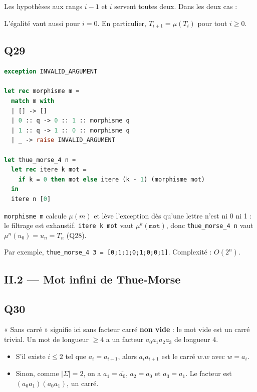 \documentclass[11pt,a4paper]{article}
\providecommand{\tightlist}{\setlength{\itemsep}{0pt}\setlength{\parskip}{0pt}}
\newcommand{\equationajustee}[1]{%
  \sbox{\boiteequation}{$\displaystyle #1$}%
  \ifdim\wd\boiteequation>\linewidth
    \[\resizebox{\linewidth}{!}{\usebox{\boiteequation}}\]%
  \else
    \[#1\]%
  \fi}
\begin{document}
Les hypothèses aux rangs \(i-1\) et \(i\) servent toutes deux. Dans les deux cas :

\equationajustee{\boxed{\forall i\in\mathbb N^\ast,\ u_i=T_i}}

L'égalité vaut aussi pour \(i=0\). En particulier, \(T_{i+1}=\mu(T_i)\) pour tout \(i\ge 0\).

\hypertarget{q29}{%
\subsection{Q29}\label{q29}}

\begin{lstlisting}[language=Caml]
exception INVALID_ARGUMENT

let rec morphisme m =
  match m with
  | [] -> []
  | 0 :: q -> 0 :: 1 :: morphisme q
  | 1 :: q -> 1 :: 0 :: morphisme q
  | _ -> raise INVALID_ARGUMENT

let thue_morse_4 n =
  let rec itere k mot =
    if k = 0 then mot else itere (k - 1) (morphisme mot)
  in
  itere n [0]
\end{lstlisting}

\texttt{morphisme\ m} calcule \(\mu(m)\) et lève l'exception dès qu'une lettre n'est ni 0 ni 1 : le filtrage est exhaustif. \texttt{itere\ k\ mot} vaut \(\mu^k(\texttt{mot})\), donc \texttt{thue\_morse\_4\ n} vaut \(\mu^n(u_0)=u_n=T_n\) (Q28).

Par exemple, \texttt{thue\_morse\_4\ 3\ =\allowbreak{}\ {[}0;\allowbreak{}1;\allowbreak{}1;\allowbreak{}0;\allowbreak{}1;\allowbreak{}0;\allowbreak{}0;\allowbreak{}1{]}\allowbreak{}}. Complexité : \(O(2^n)\).

\hypertarget{ii.2-mot-infini-de-thue-morse}{%
\subsection{II.2 --- Mot infini de Thue-Morse}\label{ii.2-mot-infini-de-thue-morse}}

\hypertarget{q30}{%
\subsection{Q30}\label{q30}}

« Sans carré » signifie ici sans facteur carré \textbf{non vide} : le mot vide est un carré trivial. Un mot de longueur \(\ge 4\) a un facteur \(a_0a_1a_2a_3\) de longueur 4.

\begin{itemize}
\tightlist
\item
  S'il existe \(i\le 2\) tel que \(a_i=a_{i+1}\), alors \(a_ia_{i+1}\) est le carré \(w.w\) avec \(w=a_i\).
\item
  Sinon, comme \(|\Sigma|=2\), on a \(a_1=\overline{a_0}\), \(a_2=a_0\) et \(a_3=a_1\). Le facteur est \((a_0a_1)(a_0a_1)\), un carré.
\end{itemize}
\end{document}
